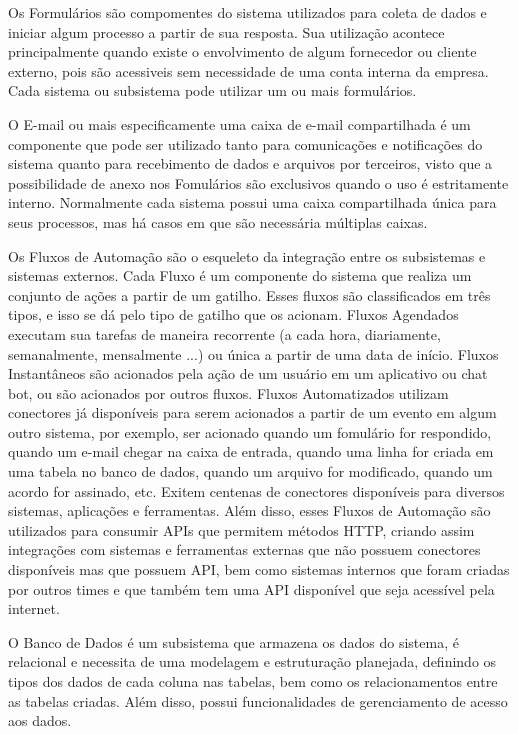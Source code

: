 	Os Formulários são compomentes do sistema utilizados para coleta de dados e iniciar algum processo a partir de sua resposta. Sua utilização acontece principalmente quando existe
	o envolvimento de algum fornecedor ou cliente externo, pois são acessiveis sem necessidade de uma conta interna da empresa. Cada sistema ou subsistema pode utilizar um ou mais formulários.

	O E-mail ou mais especificamente uma caixa de e-mail compartilhada é um componente que pode ser utilizado tanto para comunicações e notificações do sistema quanto para recebimento de dados
	e arquivos por terceiros, visto que a possibilidade de anexo nos Fomulários são exclusivos quando o uso é estritamente interno. Normalmente cada sistema possui uma caixa compartilhada única
	para seus processos, mas há casos em que são necessária múltiplas caixas.

	Os Fluxos de Automação são o esqueleto da integração entre os subsistemas e sistemas externos. Cada Fluxo é um componente do sistema que realiza um conjunto de ações a partir de um gatilho.
	Esses fluxos são classificados em três tipos, e isso se dá pelo tipo de gatilho que os acionam.	Fluxos Agendados executam sua tarefas de maneira recorrente (a cada hora, diariamente,
	semanalmente, mensalmente ...) ou única a partir de uma data de início. Fluxos Instantâneos são acionados pela ação de um usuário em um aplicativo ou chat bot, ou são acionados por outros
	fluxos. Fluxos Automatizados utilizam conectores já disponíveis para serem acionados a partir de um evento em algum outro sistema, por exemplo, ser acionado quando um fomulário for respondido,
	quando um e-mail chegar na caixa de entrada, quando uma linha for criada em uma tabela no banco de dados, quando um arquivo for modificado, quando um acordo for assinado, etc. Exitem centenas
	de conectores disponíveis para diversos sistemas, aplicações e ferramentas.	Além disso, esses Fluxos de Automação são utilizados para consumir APIs que permitem métodos HTTP, criando assim 
	integrações com sistemas e ferramentas externas que não possuem conectores disponíveis mas que possuem API, bem como sistemas internos que foram criadas por outros times e que também tem
	uma API disponível que seja acessível pela internet.

	O Banco de Dados é um subsistema que armazena os dados do sistema, é relacional e necessita de uma modelagem e estruturação planejada, definindo os tipos dos dados de cada coluna nas tabelas,
	bem como os relacionamentos entre as tabelas criadas. Além disso, possui funcionalidades de gerenciamento de acesso aos dados.

